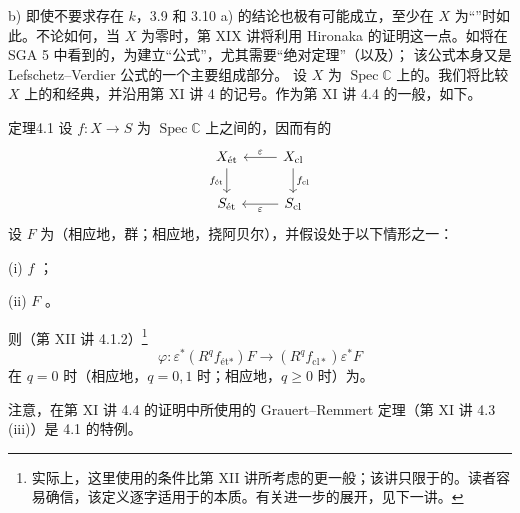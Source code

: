 b) 即使不要求存在 $k$，3.9 和 3.10 a) 的结论也极有可能成立，至少在 $X$ 为“”时如此。不论如何，当 $X$ 为零时，第 XIX 讲将利用 Hironaka 的证明这一点。如将在 SGA 5 中看到的，为建立“公式”，尤其需要“绝对定理”（以及）；
该公式本身又是 Lefschetz--Verdier 公式的一个主要组成部分。
设 $X$ 为 $\operatorname{Spec}\mathbb C$ 上的。我们将比较 $X$ 上的和经典，并沿用第 XI 讲 4 的记号。作为第 XI 讲 4.4 的一般，如下。
\begin{SGAresult}{定理}{4.1}
设 $f:X\to S$ 为 $\operatorname{Spec}\mathbb C$ 上之间的，因而有的
\[
\begin{tikzcd}
X_{\text{ét}}\arrow[d,"f_{\text{ét}}"']&X_{\mathrm{cl}}\arrow[l,"\varepsilon"']\arrow[d,"f_{\mathrm{cl}}"]\\
S_{\text{ét}}&S_{\mathrm{cl}}\arrow[l,"\varepsilon"]
\end{tikzcd}
\]
设 $F$ 为（相应地，群；相应地，挠阿贝尔），并假设处于以下情形之一：

(i) $f$ ；

(ii) $F$ 。

则（第 XII 讲 4.1.2）\footnote{实际上，这里使用的条件比第 XII 讲所考虑的更一般；该讲只限于的。读者容易确信，该定义逐字适用于的本质。有关进一步的展开，见下一讲。}
\[
\varphi:\varepsilon^*(R^qf_{\text{ét}*})F\longrightarrow(R^qf_{\mathrm{cl}*})\varepsilon^*F
\]
在 $q=0$ 时（相应地，$q=0,1$ 时；相应地，$q\geq0$ 时）为。
\end{SGAresult}
注意，在第 XI 讲 4.4 的证明中所使用的 Grauert--Remmert 定理（第 XI 讲 4.3 (iii)）是 4.1 的特例。


